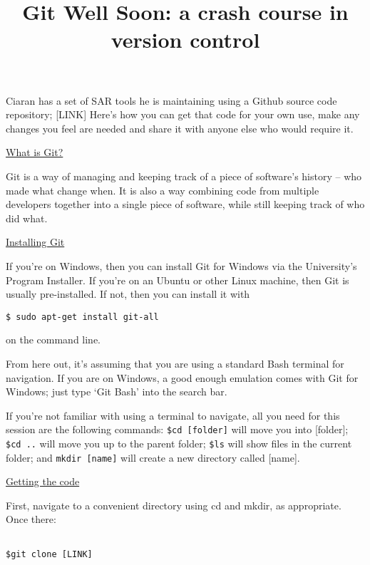 \documentclass[11pt, a4paper, english]{article}
\newenvironment{wrapbox}[1][r]
	{\wrapfigure{#1}{0.35\textwidth}\tcolorbox}
	{\endtcolorbox\endwrapfigure}
\begin{document}
\title{Git Well Soon: a crash course in version control}

\maketitle

Ciaran has a set of SAR tools he is maintaining using a Github source code repository; [LINK] Here’s how you can get that code for your own use, make any changes you feel are needed and share it with anyone else who would require it.

\underline{What is Git?}

Git is a way of managing and keeping track of a piece of software’s history – who made what change when. It is also a way combining code from multiple developers together into a single piece of software, while still keeping track of who did what.

\underline{Installing Git}

If you're on Windows, then you can install Git for Windows via the University’s Program Installer. If you're on an Ubuntu or other Linux machine, then Git is usually pre-installed. If not, then you can install it with

\begin{verbatim}
$ sudo apt-get install git-all
\end{verbatim}

on the command line.

\begin{wrapbox}
From here out, it’s assuming that you are using a standard Bash terminal for navigation. If you are on Windows, a good enough emulation comes with Git for Windows; just type ‘Git Bash’ into the search bar.
\end{wrapbox}

\begin{wrapbox}
If you’re not familiar with using a terminal to navigate, all you need for this session are the following commands: \verb|$cd [folder]| will move you into [folder]; \verb|$cd ..| will move you up to the parent folder; \verb|$ls| will show files in the current folder; and \verb|mkdir [name]| will create a new directory called [name].
\end{wrapbox}

\underline{Getting the code}

First, navigate to a convenient directory using cd and mkdir, as appropriate. Once there:

\begin{verbatim}

$git clone [LINK]

\end{verbatim}
\end{document}
